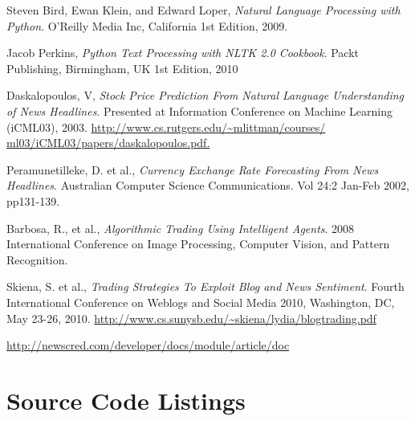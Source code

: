 \documentclass[]{article}
\begin{document}
\begin{thebibliography}{9}

  Steven Bird, Ewan Klein, and Edward Loper,
  \emph{Natural Language Processing with Python}.
  O'Reilly Media Inc, California
  1st Edition,
  2009.

  Jacob Perkins,
  \emph{Python Text Processing with NLTK 2.0 Cookbook}.
  Packt Publishing, Birmingham, UK
  1st Edition,
  2010

  Daskalopoulos, V,
  \emph{Stock Price Prediction From Natural Language Understanding of News Headlines}.
  Presented at Information Conference on Machine Learning (iCML03), 2003. 
  \url{http://www.cs.rutgers.edu/~mlittman/courses/ ml03/iCML03/papers/daskalopoulos.pdf.}

  Peramunetilleke, D. et al., 
  \emph{Currency Exchange Rate Forecasting From News Headlines}.
  Australian Computer Science Communications.
  Vol 24:2 Jan-Feb 2002,
  pp131-139.

  Barbosa, R., et al.,
  \emph{Algorithmic Trading Using Intelligent Agents}.
  2008 International Conference on Image Processing, Computer Vision, and Pattern Recognition.

  Skiena, S. et al.,
  \emph{Trading Strategies To Exploit Blog and News Sentiment}.
  Fourth International Conference on Weblogs and Social Media 2010,
  Washington, DC, May 23-26, 2010. 
  \url{http://www.cs.sunysb.edu/~skiena/lydia/blogtrading.pdf}

\url{http://newscred.com/developer/docs/module/article/doc}

\end{thebibliography}
\section{Source Code Listings}




\end{document}
